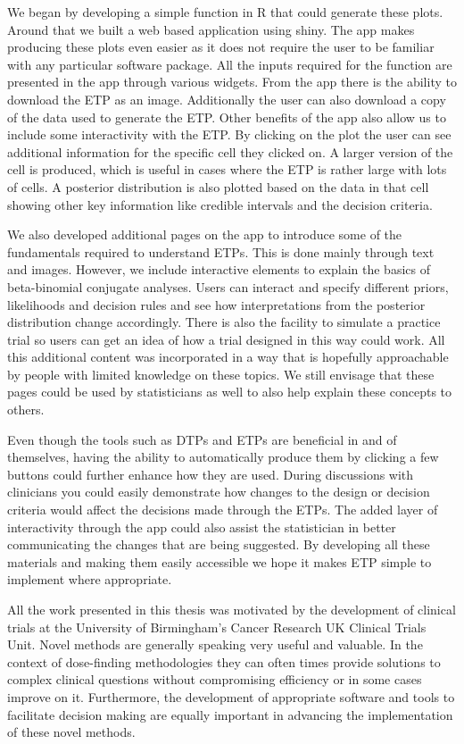 We began by developing a simple function in R that could generate these plots. Around that we built a web based application using shiny. The app makes producing these plots even easier as it does not require the user to be familiar with any particular software package. All the inputs required for the function are presented in the app through various widgets. From the app there is the ability to download the ETP as an image. Additionally the user can also download a copy of the data used to generate the ETP. Other benefits of the app also allow us to include some interactivity with the ETP. By clicking on the plot the user can see additional information for the specific cell they clicked on. A larger version of the cell is produced, which is useful in cases where the ETP is rather large with lots of cells. A posterior distribution is also plotted based on the data in that cell showing other key information like credible intervals and the decision criteria.   

We also developed additional pages on the app to introduce some of the fundamentals required to understand ETPs. This is done mainly through text and images. However, we include interactive elements to explain the basics of beta-binomial conjugate analyses. Users can interact and specify different priors, likelihoods and decision rules and see how interpretations from the posterior distribution change accordingly. There is also the facility to simulate a practice trial so users can get an idea of how a trial designed in this way could work. All this additional content was incorporated in a way that is hopefully approachable by people with limited knowledge on these topics. We still envisage that these pages could be used by statisticians as well to also help explain these concepts to others. 

Even though the tools such as DTPs and ETPs are beneficial in and of themselves, having the ability to automatically produce them by clicking a few buttons could further enhance how they are used. During discussions with clinicians you could easily demonstrate how changes to the design or decision criteria would affect the decisions made through the ETPs. The added layer of interactivity through the app could also assist the statistician in better communicating the changes that are being suggested. By developing all these materials and making them easily accessible we hope it makes ETP simple to implement where appropriate.

All the work presented in this thesis was motivated by the development of clinical trials at the University of Birmingham's Cancer Research UK Clinical Trials Unit. Novel methods are generally speaking very useful and valuable. In the context of dose-finding methodologies they can often times provide solutions to complex clinical questions without compromising efficiency or in some cases improve on it. Furthermore, the development of appropriate software and tools to facilitate decision making are equally important in advancing the implementation of these novel methods.  